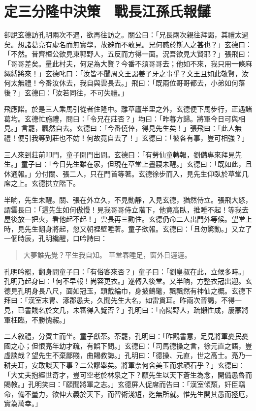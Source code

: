 
\chapter{定三分隆中決策　戰長江孫氏報讎}

卻說玄德訪孔明兩次不遇，欲再往訪之。關公曰：「兄長兩次親往拜謁，其禮太過矣。想諸葛亮有虛名而無實學，故避而不敢見。兄何惑於斯人之甚也？」玄德曰：「不然。昔齊桓公欲見東郭野人，五反而方得一面。況吾欲見大賢耶？」張飛曰：「哥哥差矣。量此村夫，何足為大賢？今番不須哥哥去；他如不來，我只用一條麻繩縛將來！」玄德叱曰：「汝皆不聞周文王謁姜子牙之事乎？文王且如此敬賢，汝何太無禮！今番汝休去，我自與雲長去。」飛曰：「既兩位哥哥都去，小弟如何落後？」玄德曰：「汝若同往，不可失禮。」

飛應諾。於是三人乘馬引從者住隆中。離草廬半里之外，玄德便下馬步行，正遇諸葛均。玄德忙施禮，問曰：「令兄在莊否？」均曰：「昨暮方歸。將軍今日可與相見。」言罷，飄然自去。玄德曰：「今番僥倖，得見先生矣！」張飛曰：「此人無禮！便引我等到莊也不妨！何故竟自去了！」玄德曰：「彼各有事，豈可相強？」

三人來到莊前叩門，童子開門出問。玄德曰：「有勞仙童轉報，劉備專來拜見先生。」童子曰：「今日先生雖在家，但現在草堂上晝寢未醒。」玄德曰：「既如此，且休通報。」分付關、張二人，只在門首等著。玄德徐步而入，見先生仰臥於草堂几席之上。玄德拱立階下。

半晌，先生未醒。關、張在外立久，不見動靜，入見玄德，猶然侍立。張飛大怒，謂雲長曰：「這先生如何傲慢！見我哥哥侍立階下，他竟高臥，推睡不起！等我去屋後放一把火，看他起不起！」雲長再三勸住。玄德仍命二人出門外等候。望堂上時，見先生翻身將起，忽又朝裡壁睡著。童子欲報。玄德曰：「且勿驚動。」又立了一個時辰，孔明纔醒，口吟詩曰：

\begin{quote}
大夢誰先覺？平生我自知。
草堂春睡足，窗外日遲遲。
\end{quote}

孔明吟罷，翻身問童子曰：「有俗客來否？」童子曰：「劉皇叔在此，立候多時。」孔明乃起身曰：「何不早報！尚容更衣。」遂轉入後堂。又半晌，方整衣冠出迎。玄德見孔明身長八尺，面如冠玉，頭戴綸巾，身披鶴氅，飄飄然有神仙之概。玄德下拜曰：「漢室末冑、涿郡愚夫，久聞先生大名，如雷貫耳。昨兩次晉謁，不得一見，已書賤名於文几，未審得入覽否？」孔明曰：「南陽野人，疏懶性成，屢蒙將軍枉臨，不勝愧赧。」

二人敘禮，分賓主而坐。童子獻茶。茶罷，孔明曰：「昨觀書意，足見將軍憂民憂國之心；但恨亮年幼才疏，有誤下問。」玄德曰：「司馬德操之言，徐元直之語，豈虛談哉？望先生不棄鄙賤，曲賜教誨。」孔明曰：「德操、元直，世之高士。亮乃一耕夫耳，安敢談天下事？二公謬舉矣。將軍奈何舍美玉而求頑石乎？」玄德曰：「大丈夫抱經世奇才，豈可空老於林泉之下？願先生以天下蒼生為念，開備愚魯而賜教。」孔明笑曰：「願聞將軍之志。」玄德屏人促席而告曰：「漢室傾頹，奸臣竊命，備不量力，欲伸大義於天下，而智術淺短，迄無所就。惟先生開其愚而拯厄，實為萬幸。」

